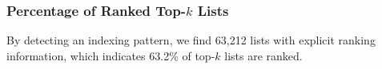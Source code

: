 \subsubsection{Percentage of Ranked Top-$k$ Lists}
\label{sec:rankedlist}
By detecting an indexing pattern, we find 63,212 lists with explicit ranking information, 
which indicates 63.2\% of top-$k$ lists are ranked.

